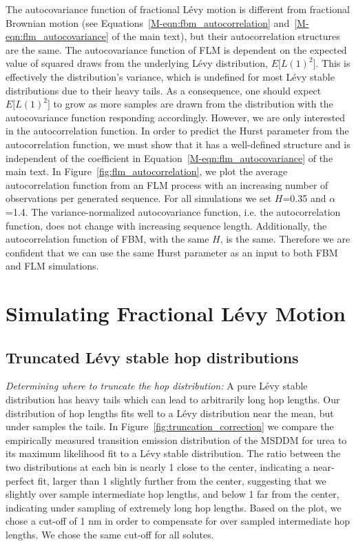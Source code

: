 \documentclass{article}
\begin{document}
  The autocovariance function of fractional L\'evy motion is different from fractional
  Brownian motion (see Equations~\ref{M-eqn:fbm_autocorrelation}
  and~\ref{M-eqn:flm_autocovariance} of the main text), but their autocorrelation 
  structures are the same. The autocovariance function of FLM is dependent on the 
  expected value of squared draws from the underlying L\'evy distribution, $E\big[L(1)^2\big]$. 
  This is effectively the distribution's variance, which is undefined for most 
  L\'evy stable distributions due to their heavy tails. As a consequence, one should 
  expect $E\big[L(1)^2\big]$ to grow as more samples are drawn from the distribution
  with the autocovariance function responding accordingly. 
  However, we are only interested in the autocorrelation function. In order to predict
  the Hurst parameter from the autocorrelation function, we must show that it has 
  a well-defined structure and is independent of the coefficient in 
  Equation~\ref{M-eqn:flm_autocovariance} of the main text. In Figure~\ref{fig:flm_autocorrelation}, 
  we plot the average autocorrelation function from an FLM process with an increasing 
  number of observations per generated sequence. For all simulations we set $H$=0.35 
  and $\alpha$=1.4. The variance-normalized autocovariance function, i.e. the autocorrelation
  function, does not change with increasing sequence length. Additionally, the
  autocorrelation function of FBM, with the same $H$, is the same. Therefore we are 
  confident that we can use the same Hurst parameter as an input to both FBM and FLM
  simulations.
  
  \newpage
  
  \section{Simulating Fractional L\'evy Motion}\label{section:sFLM}
  
  \subsection{Truncated L\'evy stable hop distributions}\label{section:truncation}
  
  \textit{Determining where to truncate the hop distribution:} A pure
  L\'evy stable distribution has heavy tails which can lead to arbitrarily
  long hop lengths. Our distribution of hop lengths fits well to a L\'evy
  distribution near the mean, but under samples the tails. In 
  Figure~\ref{fig:truncation_correction} we compare the empirically 
  measured transition emission distribution of the MSDDM for urea to its maximum likelihood fit to
  a L\'evy stable distribution. The ratio between the two distributions 
  at each bin is nearly 1 close to the center, indicating a near-perfect
  fit, larger than 1 slightly further from the center, suggesting that 
  we slightly over sample intermediate hop lengths, and below 1 far from 
  the center, indicating under sampling of extremely long hop lengths.
  Based on the plot, we chose a cut-off of 1 nm in order to compensate for
  over sampled intermediate hop lengths. We chose the same cut-off for all
  solutes.
  
\end{document}
